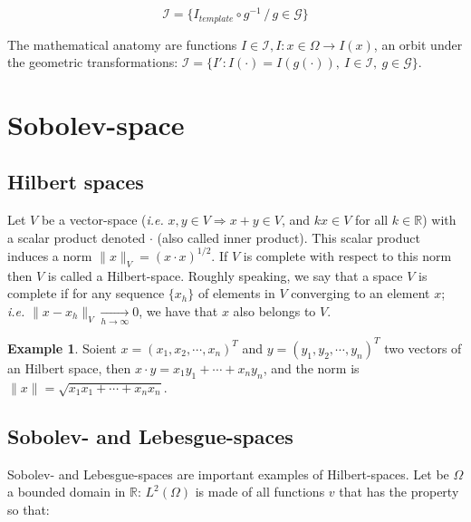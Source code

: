 \documentclass[final, paper=letter,5p,times,twocolumn]{elsarticle}
\theoremstyle{definition}
\newtheorem{example}[theorem]{Example} %
\begin{document}
{$$
\mathcal{I} = \{ I_{template} \circ g^{-1} \, / \, g \in \mathcal{G} \}
$$

\begin{definition}
  The mathematical anatomy are functions $I \in \mathcal{I}, I: x \in \Omega \rightarrow I(x)$, an orbit under the geometric transformations: $\mathcal{I} = \lbrace I':I(\cdot) = I(g(\cdot)),~I \in \mathcal{I},~g \in \mathcal{G} \rbrace$.
\end{definition}

\section{Sobolev-space}


\subsection{Hilbert spaces}

Let $V$ be a vector-space ({\it i.e.} $x, y \in V \Rightarrow x + y \in V$, and $kx \in V$ for all $k \in \mathbb{R}$) with a scalar product denoted $\cdot$ (also called inner product). This scalar product induces a norm $\| x \|_{V} = (x \cdot x)^{1/2}$. If $V$ is complete with respect to this norm then $V$ is called a Hilbert-space. Roughly speaking, we say that a space $V$ is complete if for any sequence $\{ x_{h} \}$ of elements in $V$ converging to an element $x$; {\it i.e.} $ \| x - x_{h}\|_{V} \underset{h \rightarrow \infty}{\rightarrow} 0$, we have that $x$ also belongs to $V$.

\begin{example}
  Soient $x = (x_{1}, x_{2}, \cdots, x_{n})^{T}$ and $y = (y_{1}, y_{2}, \cdots, y_{n})^{T}$ two vectors of an Hilbert space, then $x \cdot y = x_{1}y_{1} + \cdots + x_{n}y_{n}$, and the norm is $\| x \| = \sqrt{x_{1}x_{1} + \cdots + x_{n}x_{n}}$.
\end{example}
  

\subsection{Sobolev- and Lebesgue-spaces}

Sobolev- and Lebesgue-spaces are important examples of Hilbert-spaces. Let be $\Omega$ a bounded domain in $\mathbb{R}$: $L^{2}(\Omega)$ is made of all functions $v$ that has the property so that: \\

}
\end{document}
